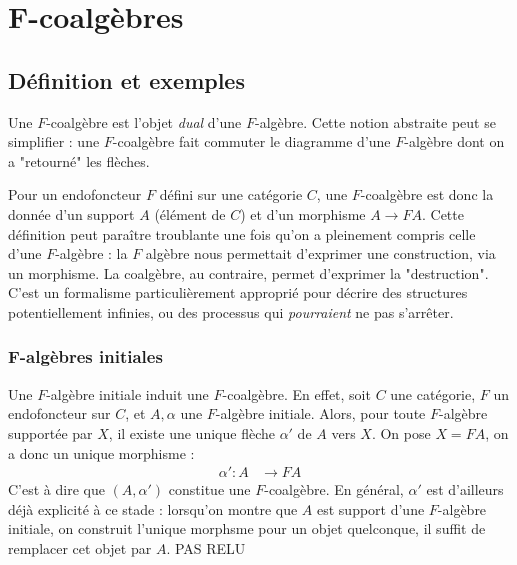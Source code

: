 \documentclass{article}
\begin{document}
\section{F-coalgèbres}

\subsection{Définition et exemples}

Une $F$-coalgèbre est l'objet \textit{dual} d'une $F$-algèbre. Cette notion abstraite peut se simplifier : une $F$-coalgèbre fait commuter le diagramme d'une $F$-algèbre dont on a "retourné" les flèches.

\begin{center}
\end{center}

Pour un endofoncteur $F$ défini sur une catégorie $C$, une $F$-coalgèbre est donc la donnée d'un support $A$ (élément de $C$) et d'un morphisme $A \rightarrow FA$. Cette définition peut paraître troublante une fois qu'on a pleinement compris celle d'une $F$-algèbre : la $F$ algèbre nous permettait d'exprimer une construction, via un morphisme. La coalgèbre, au contraire, permet d'exprimer la "destruction". C'est un formalisme particulièrement approprié  pour décrire des structures potentiellement infinies, ou des processus qui \textit{pourraient} ne pas s'arrêter.

\subsubsection{F-algèbres initiales}

Une $F$-algèbre initiale induit une $F$-coalgèbre. En effet, soit $C$ une catégorie, $F$ un endofoncteur sur $C$, et $A, \alpha$ une $F$-algèbre initiale. Alors, pour toute $F$-algèbre supportée par $X$, il existe une unique flèche $ \alpha'$ de $A$ vers $X$. On pose $X = FA$, on a donc un unique morphisme : 
\begin{align*}
    \alpha' : A & \rightarrow FA 
\end{align*}
C'est à dire que $(A, \alpha')$ constitue une $F$-coalgèbre. En général, $\alpha'$ est d'ailleurs déjà explicité à ce stade : lorsqu'on montre que $A$ est support d'une $F$-algèbre initiale, on construit l'unique morphsme pour un objet quelconque, il suffit de remplacer cet objet par $A$.
PAS RELU
\end{document}
